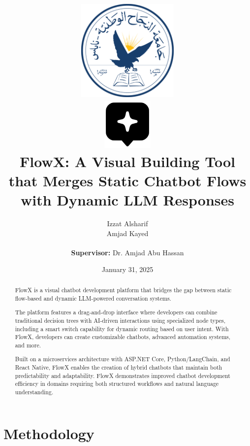 \documentclass[12pt, a4paper]{report}
\title{
    \includegraphics[height=5cm]{assets/NNU_Logo.png} \\[1cm]
    \includegraphics[height=2.5cm]{assets/FlowX_Logo.png} \\[1cm]
    FlowX: A Visual Building Tool that Merges Static Chatbot Flows with Dynamic LLM Responses
}
\author{
    Izzat Alsharif \\
    Amjad Kayed
    \\\\
    \textbf{Supervisor:} Dr. Amjad Abu Hassan
}
\date{January 31, 2025}
\begin{document}
\maketitle
\tableofcontents
\listoffigures

\begin{abstract}
FlowX is a visual chatbot development platform that bridges the gap between static flow-based and dynamic LLM-powered conversation systems. 
\par\medskip
The platform features a drag-and-drop interface where developers can combine traditional decision trees with AI-driven interactions using specialized node types, including a smart switch capability for dynamic routing based on user intent. With FlowX, developers can create customizable chatbots, advanced automation systems, and more.
\par\medskip
Built on a microservices architecture with ASP.NET Core, Python/LangChain, and React Native, FlowX enables the creation of hybrid chatbots that maintain both predictability and adaptability. FlowX demonstrates improved chatbot development efficiency in domains requiring both structured workflows and natural language understanding.
\end{abstract}






\chapter{Methodology}








\appendix




\renewcommand{\bibname}{References}


\end{document}
